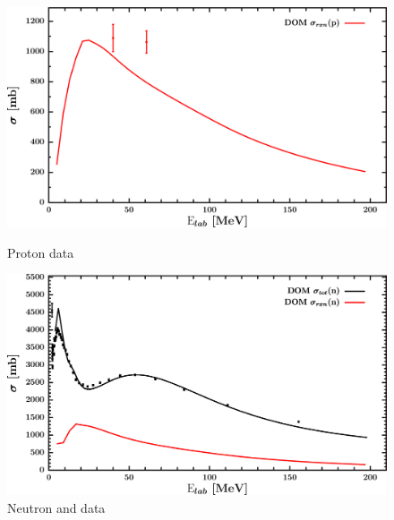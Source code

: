 \begin{figure}[H]
    \centering
    \begin{minipage}{0.45\textwidth}
        \centering
        \includegraphics[width=1.0\textwidth]{figures/ni64_protonInelastic.png}
        \caption{Proton \rxn data}
        \label{DOMFitData_ni64_proton_inelastic}
    \end{minipage}\hfill
    \begin{minipage}{0.45\textwidth}
        \centering
        \includegraphics[width=1.0\textwidth]{figures/ni64_neutronInelastic.png}
        \caption{Neutron \rxn and \tot data}
        \label{DOMFitData_ni64_neutron_inelastic}
    \end{minipage}
\end{figure}

\afterpage{\clearpage}

